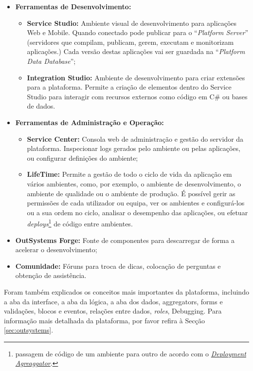       \begin{itemize} 
        \item \textbf{Ferramentas de Desenvolvimento:}
          \begin{itemize}
            \item \textbf{Service Studio:} Ambiente visual de desenvolvimento para aplicações Web e Mobile. Quando conectado pode publicar para o ``\textit{Platform Server}'' (servidores que compilam, publicam, gerem, executam e monitorizam aplicações.) Cada versão destas aplicações vai ser guardada na ``\textit{Platform Data Database}'';
            \item \textbf{Integration Studio:} Ambiente de desenvolvimento para criar extensões para a plataforma. Permite a criação de elementos dentro do Service Studio para interagir com recursos externos como código em C\# ou bases de dados.
          \end{itemize}
        \item \textbf{Ferramentas de Administração e Operação:}
          \begin{itemize}
            \item \textbf{Service Center:} Consola web de administração e gestão do servidor da plataforma. Inspecionar logs gerados pelo ambiente ou pelas aplicações, ou configurar definições do ambiente;
            \item \textbf{LifeTime:} Permite a gestão de todo o ciclo de vida da aplicação em vários ambientes, como, por exemplo, o ambiente de desenvolvimento, o ambiente de qualidade ou o ambiente de produção. É possível gerir as permissões de cada utilizador ou equipa, ver os ambientes e configurá-los ou a sua ordem no ciclo, analisar o desempenho das aplicações, ou efetuar \textit{deploys}\footnote{passagem de código de um ambiente para outro de acordo com o \hyperref[fig:deployment-aggregator]{\textit{Deployment Agreaggator}}.} de código entre ambientes.
          \end{itemize}
        \item \textbf{OutSystems Forge:} Fonte de componentes para descarregar de forma a acelerar o desenvolvimento;
        \item \textbf{Comunidade:} Fóruns para troca de dicas, colocação de perguntas e obtenção de assistência\cite{outsystems-components-and-tools}.
      \end{itemize}

      Foram também explicados os conceitos mais importantes da plataforma, incluindo a aba da interface, a aba da lógica, a aba dos dados, aggregators, forms e validações, blocos e eventos, relações entre dados, \textit{roles}, Debugging. Para informação mais detalhada da plataforma, por favor refira à Secção \ref{sec:outsystems}.
    
